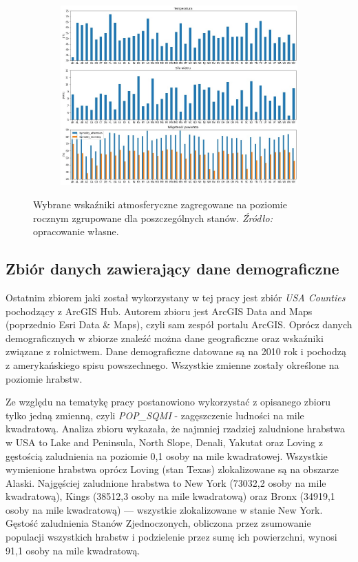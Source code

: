 \documentclass[polish, twoside, 12pt, a4paper]{article}
\theoremstyle{definition}
\theoremstyle{plain}
\theoremstyle{remark}
\begin{document}
\begin{figure}[H]
  \centering
  \begin{subfigure}[t]{\textwidth}
    \includegraphics[width=15cm]{atm-all.jpg}
  \end{subfigure}
  \captionsetup{margin=10pt,font=small,labelfont=bf,width=.8\textwidth}
  \caption{Wybrane wskaźniki atmosferyczne zagregowane na poziomie rocznym zgrupowane dla poszczególnych stanów. \textit{Źródło:} opracowanie własne.}\label{fig:figure:xx4}
\end{figure}

\subsection{Zbiór danych zawierający dane demograficzne}

Ostatnim zbiorem jaki został wykorzystany w tej pracy jest zbiór \emph{USA Counties} pochodzący z ArcGIS Hub. Autorem zbioru jest ArcGIS Data and Maps (poprzednio Esri Data \& Maps), czyli sam zespół portalu ArcGIS. Oprócz danych demograficznych w zbiorze znaleźć można dane geograficzne oraz wskaźniki związane z rolnictwem. Dane demograficzne datowane są na 2010 rok i pochodzą z amerykańskiego spisu powszechnego. Wszystkie zmienne zostały określone na poziomie hrabstw.

Ze względu na tematykę pracy postanowiono wykorzystać z opisanego zbioru tylko jedną zmienną, czyli \emph{POP\_SQMI} - zagęszczenie ludności na mile kwadratową. Analiza zbioru wykazała, że najmniej rzadziej zaludnione hrabstwa w USA to Lake and Peninsula, North Slope, Denali, Yakutat oraz Loving z gęstością zaludnienia na poziomie 0,1 osoby na mile kwadratowej. Wszystkie wymienione hrabstwa oprócz Loving (stan Texas) zlokalizowane są na obszarze Alaski. Najgęściej zaludnione hrabstwa to New York (73032,2 osoby na mile kwadratową), Kings (38512,3 osoby na mile kwadratową) oraz Bronx (34919,1 osoby na mile kwadratową) --- wszystkie zlokalizowane w stanie New York. Gęstość zaludnienia Stanów Zjednoczonych, obliczona przez zsumowanie populacji wszystkich hrabstw i podzielenie przez sumę ich powierzchni, wynosi 91,1 osoby na mile kwadratową.
\end{document}
